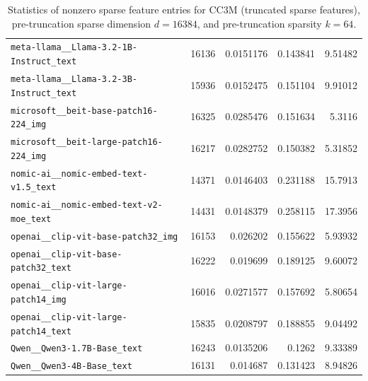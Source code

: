 \begin{table}[htbp]
{\begin{tabular}{lrrrr}
\texttt{meta-llama\_\_Llama-3.2-1B-Instruct\_text} & 16136 & 0.0151176 & 0.143841 & 9.51482 \\
\texttt{meta-llama\_\_Llama-3.2-3B-Instruct\_text} & 15936 & 0.0152475 & 0.151104 & 9.91012 \\
\texttt{microsoft\_\_beit-base-patch16-224\_img} & 16325 & 0.0285476 & 0.151634 & 5.3116 \\
\texttt{microsoft\_\_beit-large-patch16-224\_img} & 16217 & 0.0282752 & 0.150382 & 5.31852 \\
\texttt{nomic-ai\_\_nomic-embed-text-v1.5\_text} & 14371 & 0.0146403 & 0.231188 & 15.7913 \\
\texttt{nomic-ai\_\_nomic-embed-text-v2-moe\_text} & 14431 & 0.0148379 & 0.258115 & 17.3956 \\
\texttt{openai\_\_clip-vit-base-patch32\_img} & 16153 & 0.026202 & 0.155622 & 5.93932 \\
\texttt{openai\_\_clip-vit-base-patch32\_text} & 16222 & 0.019699 & 0.189125 & 9.60072 \\
\texttt{openai\_\_clip-vit-large-patch14\_img} & 16016 & 0.0271577 & 0.157692 & 5.80654 \\
\texttt{openai\_\_clip-vit-large-patch14\_text} & 15835 & 0.0208797 & 0.188855 & 9.04492 \\
\texttt{Qwen\_\_Qwen3-1.7B-Base\_text} & 16243 & 0.0135206 & 0.1262 & 9.33389 \\
\texttt{Qwen\_\_Qwen3-4B-Base\_text} & 16131 & 0.014687 & 0.131423 & 8.94826 \\
\bottomrule
\end{tabular}
}%
\caption{Statistics of nonzero sparse feature entries for CC3M (truncated sparse features), pre-truncation sparse dimension $d=16384$, and pre-truncation sparsity $k=64$.}
\label{tab:sparse-feature-entries-cc3m-truncated-d16384-k64}
\end{table}
